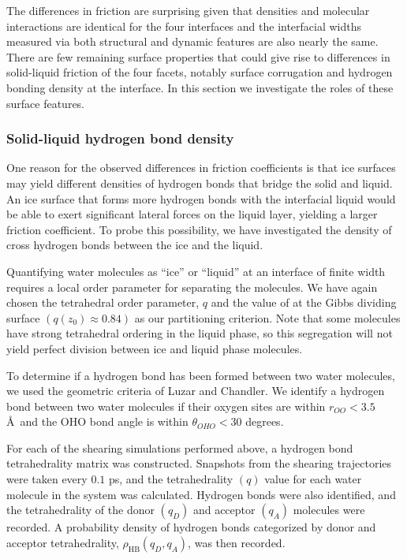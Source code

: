 \documentclass[journal = jpccck, manuscript = article]{achemso}
\begin{document}
The differences in friction are surprising given that densities and
molecular interactions are identical for the four interfaces and the
interfacial widths measured via both structural and dynamic features
are also nearly the same. There are few remaining surface properties
that could give rise to differences in solid-liquid friction of the
four facets, notably surface corrugation and hydrogen bonding density
at the interface. In this section we investigate the roles of these
surface features.

\subsubsection{Solid-liquid hydrogen bond density}
One reason for the observed differences in friction
coefficients is that ice surfaces may yield different densities of
hydrogen bonds that bridge the solid and liquid.  An ice surface that
forms more hydrogen bonds with the interfacial liquid would be able to
exert significant lateral forces on the liquid layer, yielding a
larger friction coefficient. To probe this possibility, we have
investigated the density of cross hydrogen bonds between the ice and
the liquid.

Quantifying water molecules as ``ice'' or ``liquid'' at an interface
of finite width requires a local order parameter for separating the
molecules.  We have again chosen the tetrahedral order parameter, $q$
and the value of at the Gibbs dividing surface $(q(z_0) \approx 0.84)$
as our partitioning criterion.  Note that some molecules have strong
tetrahedral ordering in the liquid phase, so this segregation will not
yield perfect division between ice and liquid phase molecules.

To determine if a hydrogen bond has been formed between two water
molecules, we used the geometric criteria of Luzar and
Chandler.\cite{Luzar1996} We identify a hydrogen bond between two
water molecules if their oxygen sites are within $r_{OO} < 3.5$
\AA~and the OHO bond angle is within $\theta_{OHO} < 30$ degrees.

For each of the shearing simulations performed above, a hydrogen bond
tetrahedrality matrix was constructed.  Snapshots from the shearing
trajectories were taken every $0.1$ ps, and the tetrahedrality $(q)$
value for each water molecule in the system was calculated. Hydrogen
bonds were also identified, and the tetrahedrality of the donor
$(q_{D})$ and acceptor $(q_{A})$ molecules were recorded. A
probability density of hydrogen bonds categorized by donor and
acceptor tetrahedrality, $\rho_\mathrm{HB}(q_D, q_A)$, was then
recorded.
\end{document}
